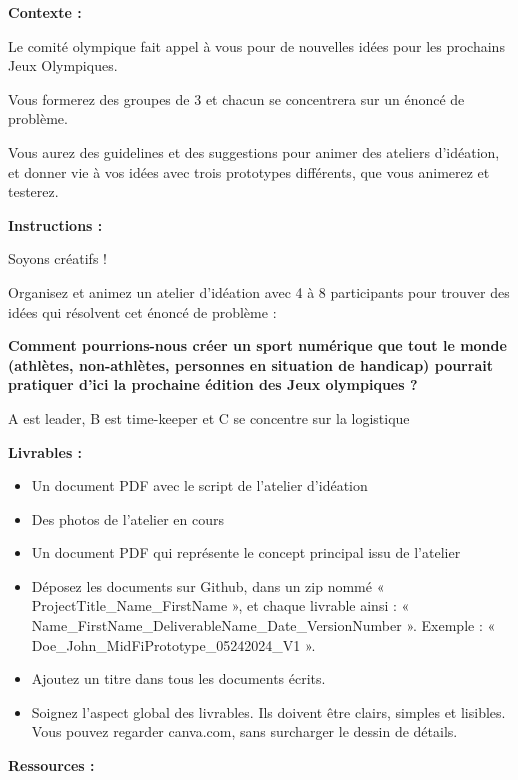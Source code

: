\makeheaderfiles

\textbf{Contexte :}

Le comité olympique fait appel à vous pour de nouvelles idées pour les prochains Jeux Olympiques.

Vous formerez des groupes de 3 et chacun se concentrera sur un énoncé de problème.

Vous aurez des guidelines et des suggestions pour animer des ateliers d'idéation, et donner vie à vos idées avec trois prototypes différents, que vous animerez et testerez.

\textbf{Instructions :}

Soyons créatifs !

Organisez et animez un atelier d'idéation avec 4 à 8 participants pour trouver des idées qui résolvent cet énoncé de problème :

\textbf{Comment pourrions-nous créer un sport numérique que tout le monde (athlètes, non-athlètes, personnes en situation de handicap) pourrait pratiquer d'ici la prochaine édition des Jeux olympiques ?}

A est leader, B est time-keeper et C se concentre sur la logistique

\textbf{Livrables :}

\begin{itemize}
\item Un document PDF avec le script de l'atelier d'idéation
\item Des photos de l'atelier en cours
\item Un document PDF qui représente le concept principal issu de l'atelier
\item Déposez les documents sur Github, dans un zip nommé « ProjectTitle\_Name\_FirstName », et chaque livrable ainsi : « Name\_FirstName\_DeliverableName\_Date\_VersionNumber ». Exemple : « Doe\_John\_MidFiPrototype\_05242024\_V1 ».
\item Ajoutez un titre dans tous les documents écrits.
\item Soignez l'aspect global des livrables. Ils doivent être clairs, simples et lisibles. Vous pouvez regarder canva.com, sans surcharger le dessin de détails.
\end{itemize}

\textbf{Ressources :}

